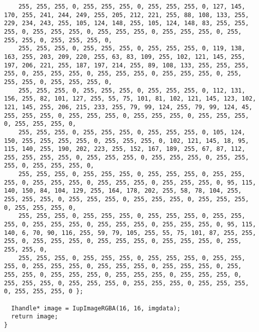 \documentclass{ctexart}
\begin{document}
\begin{lstlisting}
    255, 255, 255, 0, 255, 255, 255, 0, 255, 255, 255, 0, 127, 145, 170, 255, 241, 244, 249, 255, 205, 212, 221, 255, 88, 108, 133, 255, 229, 234, 243, 255, 105, 124, 148, 255, 105, 124, 148, 83, 255, 255, 255, 0, 255, 255, 255, 0, 255, 255, 255, 0, 255, 255, 255, 0, 255, 255, 255, 0, 255, 255, 255, 0,
    255, 255, 255, 0, 255, 255, 255, 0, 255, 255, 255, 0, 119, 138, 163, 255, 203, 209, 220, 255, 63, 83, 109, 255, 102, 121, 145, 255, 197, 206, 221, 255, 187, 197, 214, 255, 89, 108, 133, 255, 255, 255, 255, 0, 255, 255, 255, 0, 255, 255, 255, 0, 255, 255, 255, 0, 255, 255, 255, 0, 255, 255, 255, 0,
    255, 255, 255, 0, 255, 255, 255, 0, 255, 255, 255, 0, 112, 131, 156, 255, 82, 101, 127, 255, 55, 75, 101, 81, 102, 121, 145, 123, 102, 121, 145, 255, 206, 215, 233, 255, 79, 99, 124, 255, 79, 99, 124, 45, 255, 255, 255, 0, 255, 255, 255, 0, 255, 255, 255, 0, 255, 255, 255, 0, 255, 255, 255, 0,
    255, 255, 255, 0, 255, 255, 255, 0, 255, 255, 255, 0, 105, 124, 150, 255, 255, 255, 255, 0, 255, 255, 255, 0, 102, 121, 145, 18, 95, 115, 140, 255, 190, 202, 223, 255, 152, 167, 189, 255, 67, 87, 112, 255, 255, 255, 255, 0, 255, 255, 255, 0, 255, 255, 255, 0, 255, 255, 255, 0, 255, 255, 255, 0,
    255, 255, 255, 0, 255, 255, 255, 0, 255, 255, 255, 0, 255, 255, 255, 0, 255, 255, 255, 0, 255, 255, 255, 0, 255, 255, 255, 0, 95, 115, 140, 150, 84, 104, 129, 255, 164, 178, 202, 255, 58, 78, 104, 255, 255, 255, 255, 0, 255, 255, 255, 0, 255, 255, 255, 0, 255, 255, 255, 0, 255, 255, 255, 0,
    255, 255, 255, 0, 255, 255, 255, 0, 255, 255, 255, 0, 255, 255, 255, 0, 255, 255, 255, 0, 255, 255, 255, 0, 255, 255, 255, 0, 95, 115, 140, 6, 70, 90, 116, 255, 59, 79, 105, 255, 55, 75, 101, 87, 255, 255, 255, 0, 255, 255, 255, 0, 255, 255, 255, 0, 255, 255, 255, 0, 255, 255, 255, 0,
    255, 255, 255, 0, 255, 255, 255, 0, 255, 255, 255, 0, 255, 255, 255, 0, 255, 255, 255, 0, 255, 255, 255, 0, 255, 255, 255, 0, 255, 255, 255, 0, 255, 255, 255, 0, 255, 255, 255, 0, 255, 255, 255, 0, 255, 255, 255, 0, 255, 255, 255, 0, 255, 255, 255, 0, 255, 255, 255, 0, 255, 255, 255, 0 };

  Ihandle* image = IupImageRGBA(16, 16, imgdata);
  return image;
}


\end{lstlisting}
\end{document}
